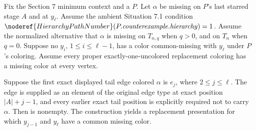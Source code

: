 \begin{lemma}
Fix the Section 7 minimum context and a
 \(P\).  Let \(\alpha\) be
missing on \(P\)'s last starred stage \(A\) and at \(y_\ell\).  Assume
the ambient Situation 7.1 condition
\(\noderef{HierarchyPathNumber}
(P.\mathit{counterexample}.\mathit{hierarchy})=1\).  Assume
the normalized alternative that \(\alpha\) is missing on \(T_{n,q}\)
when \(q>0\), and on \(T_n\) when \(q=0\).  Suppose no
\(y_i\), \(1\leq i\leq\ell-1\), has a color common-missing with
\(y_\ell\) under \(P\)'s coloring.  Assume every proper
exactly-one-uncolored replacement coloring has a missing color at every
vertex.

Suppose the first exact displayed tail edge colored \(\alpha\) is
\(e_j\), where \(2\leq j\leq\ell\).  The edge is supplied as an element
of the original edge type at exact position \(|A|+j-1\), and every
earlier exact tail position is explicitly required not to carry
\(\alpha\).  Then
 is nonempty.
The construction yields a replacement presentation for which
\(y_{j-1}\) and \(y_\ell\) have a common missing color.
\end{lemma}
